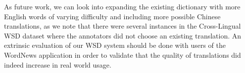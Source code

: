\documentclass[11pt]{article}
\begin{document}
As future work, we can look into expanding the existing dictionary with more English words of varying difficulty and including more possible Chinese translations, as we note that there were several instances in the Cross-Lingual WSD dataset where the annotators did not choose an existing translation. An extrinsic evaluation of our WSD system should be done with users of the WordNews application in order to validate that the quality of translations did indeed increase in real world usage. 


%
%

%



\end{document}
